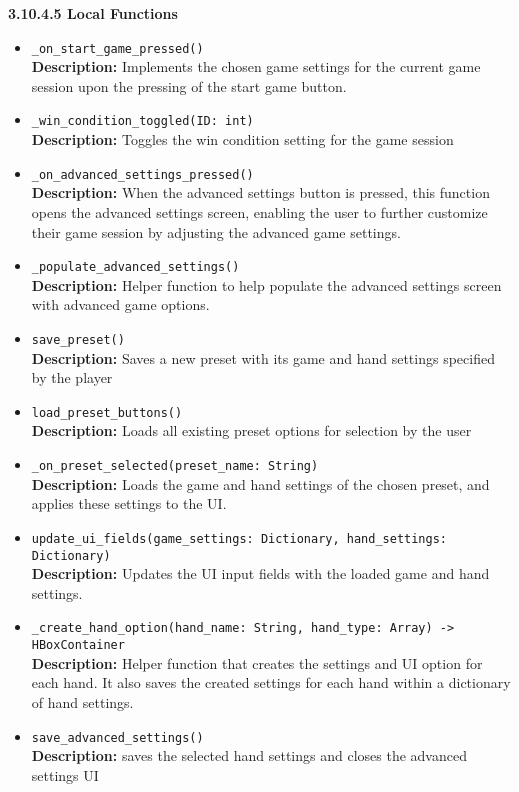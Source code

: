 \documentclass[12pt, titlepage]{article}
\begin{document}
\textbf{3.10.4.5 Local Functions}
\begin{itemize}
    \item \texttt{\_on\_start\_game\_pressed() }\\
	\textbf{Description:} Implements the chosen game settings for the current game session upon the pressing of the start game button. 
	\item \texttt{\_win\_condition\_toggled(ID: int) }\\
	\textbf{Description:} Toggles the win condition setting for the game session
	\item \texttt{\_on\_advanced\_settings\_pressed() }\\
	\textbf{Description:} When the advanced settings button is pressed, this function opens the advanced settings screen, enabling the user to further customize their game session by adjusting the advanced game settings.
	\item \texttt{\_populate\_advanced\_settings() }\\
	\textbf{Description:} Helper function to help populate the advanced settings screen with advanced game options.
	\item \texttt{save\_preset() }\\
	\textbf{Description:} Saves a new preset with its game and hand settings specified by the player
	\item \texttt{load\_preset\_buttons()}\\
	\textbf{Description:} Loads all existing preset options for selection by the user
	\item \texttt{\_on\_preset\_selected(preset\_name: String)}\\
	\textbf{Description:} Loads the game and hand settings of the chosen preset, and applies these settings to the UI.
	\item \texttt{update\_ui\_fields(game\_settings: Dictionary, hand\_settings: Dictionary) }\\
	\textbf{Description:} Updates the UI input fields with the loaded game and hand settings.
	\item \texttt{\_create\_hand\_option(hand\_name: String, hand\_type: Array) -> HBoxContainer }\\
	\textbf{Description:} Helper function that creates the settings and UI option for each hand. It also saves the created settings for each hand within a dictionary of hand settings.
	\item \texttt{save\_advanced\_settings() }\\
	\textbf{Description:} saves the selected hand settings and closes the advanced settings UI

\end{itemize}
\end{document}

